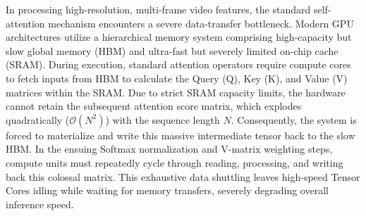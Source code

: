 In processing high-resolution, multi-frame video features, the standard self-attention mechanism encounters a severe data-transfer bottleneck. Modern GPU architectures utilize a hierarchical memory system comprising high-capacity but slow global memory (HBM) and ultra-fast but severely limited on-chip cache (SRAM). During execution, standard attention operators require compute cores to fetch inputs from HBM to calculate the Query (Q), Key (K), and Value (V) matrices within the SRAM. Due to strict SRAM capacity limits, the hardware cannot retain the subsequent attention score matrix, which explodes quadratically ($\mathcal{O}(N^2)$) with the sequence length $N$. Consequently, the system is forced to materialize and write this massive intermediate tensor back to the slow HBM. In the ensuing Softmax normalization and V-matrix weighting steps, compute units must repeatedly cycle through reading, processing, and writing back this colossal matrix. This exhaustive data shuttling leaves high-speed Tensor Cores idling while waiting for memory transfers, severely degrading overall inference speed.


